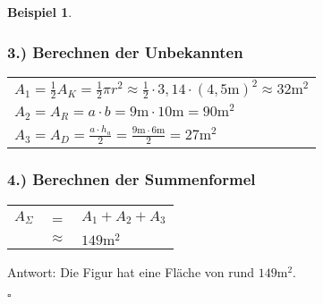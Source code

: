 \documentclass[a4paper]{book}%
\newcommand{\proofsquare}{
    \begin{flushright}
      $\square$
    \end{flushright}\xspace
}
\theoremstyle{definition}
\newtheorem{beispiel}{Beispiel}
\begin{document}
\begin{beispiel}
    \subsubsection{3.) Berechnen der Unbekannten}
    \begin{longtable}{l}
        $A_1 = \frac{1}{2} A_K = \frac{1}{2} \pi r^2 \approx \frac{1}{2} \cdot 3,14 \cdot (4,5\text{m})^2 \approx 32\text{m}^2$\\
        $A_2 = A_R = a \cdot b = 9\text{m} \cdot 10\text{m} = 90\text{m}^2$\\
        $A_3 = A_D = \frac{a \cdot h_a}{2} = \frac{9\text{m} \cdot 6\text{m}}{2} = 27\text{m}^2$
    \end{longtable}
    
    \subsubsection{4.) Berechnen der Summenformel}
    \begin{longtable}{lcl}
        $A_\Sigma$ & = & $A_1 + A_2 + A_3$\\
        & $\approx$ & $149\text{m}^2$
    \end{longtable}
    
    Antwort: Die Figur hat eine Fläche von rund $149\text{m}^2$.\proofsquare
\end{beispiel}
\end{document}
